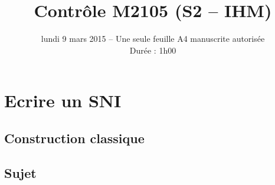 \documentclass[12pt]{article}
\title{\vspace{-3pc}\textbf{Contr\^ole M2105 (S2 -- 	IHM)}}
\date{lundi 9 mars 2015 -- Une seule feuille A4 manuscrite autoris\'ee\\
Dur\'ee : 1h00}
\begin{document}
\maketitle

\begin{center}
\end{center}

\section{Ecrire un SNI}

\subsection{Construction classique}

\subsection*{Sujet}
\end{document}
